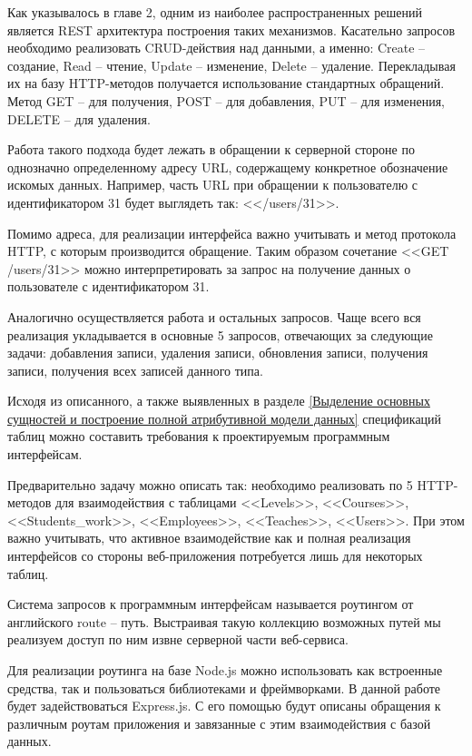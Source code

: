 Как указывалось в главе 2, одним из наиболее распространенных решений является REST архитектура построения таких механизмов.
Касательно запросов необходимо реализовать CRUD-действия над данными, а именно: Create -- создание, Read -- чтение, Update -- изменение, Delete -- удаление.
Перекладывая их на базу HTTP-методов получается использование стандартных обращений.
Метод GET -- для получения, POST -- для добавления, PUT -- для изменения, DELETE -- для удаления.

Работа такого подхода будет лежать в обращении к серверной стороне по однозначно определенному адресу URL, содержащему конкретное обозначение искомых данных.
Например, часть URL при обращении к пользователю с идентификатором 31 будет выглядеть так: <</users/31>>.

Помимо адреса, для реализации интерфейса важно учитывать и метод протокола HTTP, с которым производится обращение.
Таким образом сочетание <<GET /users/31>> можно интерпретировать за запрос на получение данных о пользователе с идентификатором 31.

Аналогично осуществляется работа и остальных запросов.
Чаще всего вся реализация укладывается в основные 5 запросов, отвечающих за следующие задачи: добавления записи, удаления записи, обновления записи, получения записи, получения всех записей данного типа.

Исходя из описанного, а также выявленных в разделе \ref{Выделение основных сущностей и построение полной атрибутивной модели данных} спецификаций таблиц можно составить требования к проектируемым программным интерфейсам.

Предварительно задачу можно описать так: необходимо реализовать по 5 HTTP-методов для взаимодействия с таблицами <<Levels>>, <<Courses>>, <<Students\_work>>, <<Employees>>, <<Teaches>>, <<Users>>.
При этом важно учитывать, что активное взаимодействие как и полная реализация интерфейсов со стороны веб-приложения потребуется лишь для некоторых таблиц.

Система запросов к программным интерфейсам называется роутингом от английского route -- путь.
Выстраивая такую коллекцию возможных путей мы реализуем доступ по ним извне серверной части веб-сервиса.

Для реализации роутинга на базе Node.js можно использовать как встроенные средства, так и пользоваться библиотеками и фреймворками.
В данной работе будет задействоваться Express.js.
С его помощью будут описаны обращения к различным роутам приложения и завязанные с этим взаимодействия с базой данных.

